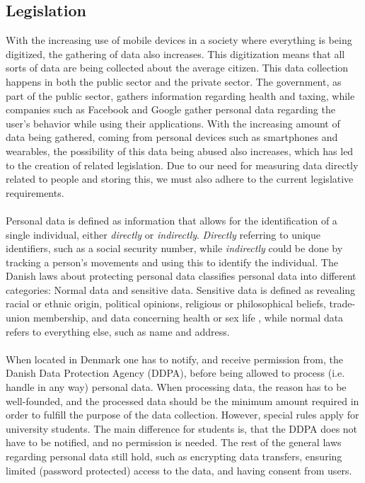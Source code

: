 
\subsection{Legislation}
\label{sub:legislation}

With the increasing use of mobile devices in a society where everything is being digitized, the gathering of data also increases. This digitization means that all sorts of data are being collected about the average citizen. This data collection happens in both the public sector and the private sector. The government, as part of the public sector, gathers information regarding health and taxing, while companies such as Facebook and Google gather personal data regarding the user's behavior while using their applications. With the increasing amount of data being gathered, coming from personal devices such as smartphones and wearables, the possibility of this data being abused also increases, which has led to the creation of related legislation. Due to our need for measuring data directly related to people and storing this, we must also adhere to the current legislative requirements. 
\\\\
Personal data is defined as information that allows for the identification of a single individual, either \emph{directly} or \emph{indirectly}. \emph{Directly} referring to unique identifiers, such as a social security number, while \emph{indirectly} could be done by tracking a person's movements and using this to identify the individual. The Danish laws about protecting personal data classifies personal data into different categories: Normal data and sensitive data. Sensitive data is defined as revealing racial or ethnic origin, political opinions, religious or philosophical beliefs, trade-union membership, and data concerning health or sex life \parencite{datatilsynet_stud1}, while normal data refers to everything else, such as name and address.
\\\\
When located in Denmark one has to notify, and receive permission from, the Danish Data Protection Agency (DDPA), before being allowed to process (i.e. handle in any way) personal data. When processing data, the reason has to be well-founded, and the processed data should be the minimum amount required in order to fulfill the purpose of the data collection. However, special rules apply for university students. The main difference for students is, that the DDPA does not have to be notified, and no permission is needed. The rest of the general laws regarding personal data still hold, such as encrypting data transfers, ensuring limited (password protected) access to the data, and having consent from users. 
